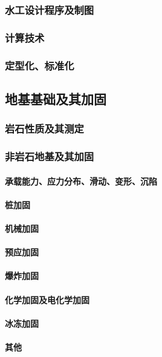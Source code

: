 \documentclass[UTF8]{../../ApplicationUniverse}
\begin{document}
        \subsubsection{水工设计程序及制图}
        \subsubsection{计算技术}
        \subsubsection{定型化、标准化}
    \subsection{地基基础及其加固}
        \subsubsection{岩石性质及其测定}
        \subsubsection{非岩石地基及其加固}
            \paragraph{承载能力、应力分布、滑动、变形、沉陷}
            \paragraph{桩加固}
            \paragraph{机械加固}
            \paragraph{预应加固}
            \paragraph{爆炸加固}
            \paragraph{化学加固及电化学加固}
            \paragraph{冰冻加固}
            \paragraph{其他}
\end{document}

